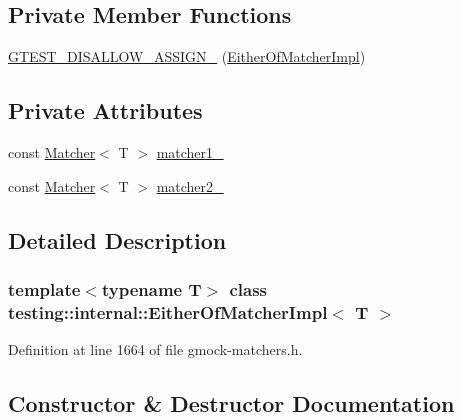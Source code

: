 \subsection*{Private Member Functions}
\begin{DoxyCompactItemize}
\item 
\hyperlink{classtesting_1_1internal_1_1EitherOfMatcherImpl_aae5bcb5598613eb6ee32793af9bcea9b}{G\+T\+E\+S\+T\+\_\+\+D\+I\+S\+A\+L\+L\+O\+W\+\_\+\+A\+S\+S\+I\+G\+N\+\_\+} (\hyperlink{classtesting_1_1internal_1_1EitherOfMatcherImpl}{Either\+Of\+Matcher\+Impl})
\end{DoxyCompactItemize}
\subsection*{Private Attributes}
\begin{DoxyCompactItemize}
\item 
const \hyperlink{classtesting_1_1Matcher}{Matcher}$<$ T $>$ \hyperlink{classtesting_1_1internal_1_1EitherOfMatcherImpl_ae4ac9a56093a18b90168cc6f8a3be9d3}{matcher1\+\_\+}
\item 
const \hyperlink{classtesting_1_1Matcher}{Matcher}$<$ T $>$ \hyperlink{classtesting_1_1internal_1_1EitherOfMatcherImpl_a73b3d0e53d7bca7ffb324d3a904eb62f}{matcher2\+\_\+}
\end{DoxyCompactItemize}


\subsection{Detailed Description}
\subsubsection*{template$<$typename T$>$\newline
class testing\+::internal\+::\+Either\+Of\+Matcher\+Impl$<$ T $>$}



Definition at line 1664 of file gmock-\/matchers.\+h.



\subsection{Constructor \& Destructor Documentation}
\mbox{\label{classtesting_1_1internal_1_1EitherOfMatcherImpl_af7008f5d8f2950fbe75e6ff9b78af584}} 
